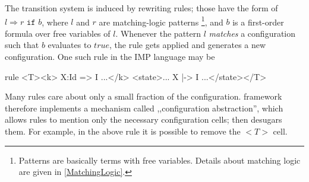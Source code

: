 \documentclass{fithesis3}
\newcommand{\var}[1]{\mathit{#1}}
\begin{document}




The transition system is induced by rewriting rules; those have the form of $l \Rightarrow r \texttt{ if } b$, where $l$ and $r$ are matching-logic patterns \footnote{Patterns are basically terms with free variables. Details about matching logic are given in \ref{MatchingLogic}.},
and $b$ is a first-order formula over free variables of $l$. Whenever the pattern $l$ \textit{matches} a configuration such that $b$ evaluates to $\var{true}$, the rule gets applied and generates a new configuration. One such rule in the IMP language may be
\begin{asciik}[basicstyle=\small]
rule <T><k> X:Id => I ...</k>
     <state>... X |-> I ...</state></T>
\end{asciik}




Many rules care about only a small fraction of the configuration. \K framework therefore implements a mechanism called ,,configuration abstraction'', which allows rules to mention only the necessary configuration cells; \K then desugars them. For example, in the above rule it is possible to remove the $<T>$ cell.





\end{document}
